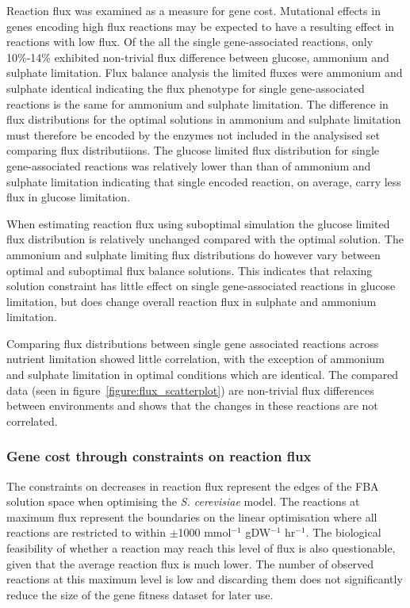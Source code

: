 Reaction flux was examined as a measure for gene cost. Mutational effects in genes encoding high flux reactions may be expected to have a resulting effect   in reactions with low flux. Of the all the single gene-associated reactions, only 10\%-14\% exhibited non-trivial flux difference between glucose, ammonium and sulphate limitation. Flux balance analysis the limited fluxes were ammonium and sulphate identical indicating the flux phenotype for single gene-associated reactions is the same for ammonium and sulphate limitation. The difference in flux distributions for the optimal solutions in ammonium and sulphate limitation must therefore be encoded by the enzymes not included in the analysised set comparing flux distributiions. The glucose limited flux distribution for single gene-associated reactions was relatively lower than than of ammonium and sulphate limitation indicating that single encoded reaction, on average, carry less flux in glucose limitation.

When estimating reaction flux using suboptimal simulation the glucose limited flux distribution is relatively unchanged compared with the optimal solution. The ammonium and sulphate limiting flux distributions do however vary between optimal and suboptimal flux balance solutions. This indicates that relaxing solution constraint has little effect on single gene-associated reactions in glucose limitation, but does change overall reaction flux in sulphate and ammonium limitation.

Comparing flux distributions between single gene associated reactions across nutrient limitation showed little correlation, with the exception of ammonium and sulphate limitation in optimal conditions which are identical. The compared data (seen in figure~\vref{figure:flux_scatterplot}) are non-trivial flux differences between environments and shows that the changes in these reactions are not correlated.

\subsubsection{Gene cost through constraints on reaction flux}%

The constraints on decreases in reaction flux represent the edges of the FBA solution space when optimising the \emph{S. cerevisiae} model. The reactions at maximum flux represent the boundaries on the linear optimisation where all reactions are restricted to within $\pm$1000 mmol$^{-1}$ gDW$^{-1}$ hr$^{-1}$. The biological feasibility of whether a reaction may reach this level of flux is also questionable, given that the average reaction flux is much lower.  The number of observed reactions at this maximum level is low and discarding them does not significantly reduce the size of the gene fitness dataset for later use.

